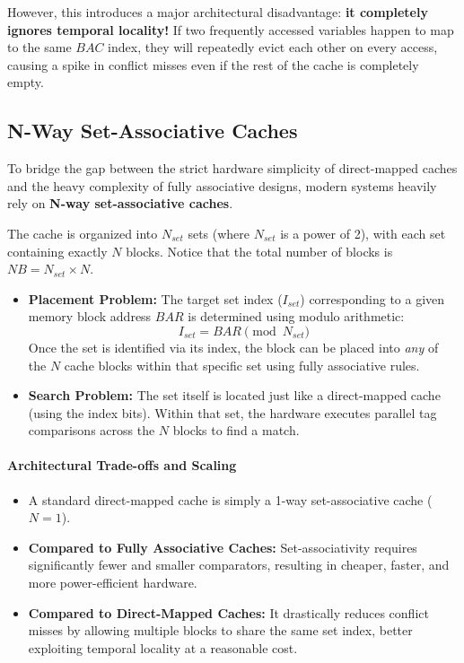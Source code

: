 However, this introduces a major architectural disadvantage: \textbf{it completely ignores temporal locality!} If two frequently accessed variables happen to map to the same $BAC$ index, they will repeatedly evict each other on every access, causing a spike in conflict misses even if the rest of the cache is completely empty.

\subsection{N-Way Set-Associative Caches}
To bridge the gap between the strict hardware simplicity of direct-mapped caches and the heavy complexity of fully associative designs, modern systems heavily rely on \textbf{N-way set-associative caches}. 

The cache is organized into $N_{set}$ sets (where $N_{set}$ is a power of 2), with each set containing exactly $N$ blocks. Notice that the total number of blocks is $NB = N_{set} \times N$.
\begin{itemize}
    \item \textbf{Placement Problem:} The target set index ($I_{set}$) corresponding to a given memory block address $BAR$ is determined using modulo arithmetic:
    \[ I_{set} = BAR \pmod{N_{set}} \]
    Once the set is identified via its index, the block can be placed into \emph{any} of the $N$ cache blocks within that specific set using fully associative rules.
    \item \textbf{Search Problem:} The set itself is located just like a direct-mapped cache (using the index bits). Within that set, the hardware executes parallel tag comparisons across the $N$ blocks to find a match.
\end{itemize}

\paragraph{Architectural Trade-offs and Scaling}
\begin{itemize}
    \item A standard direct-mapped cache is simply a 1-way set-associative cache ($N = 1$).
    \item \textbf{Compared to Fully Associative Caches:} Set-associativity requires significantly fewer and smaller comparators, resulting in cheaper, faster, and more power-efficient hardware.
    \item \textbf{Compared to Direct-Mapped Caches:} It drastically reduces conflict misses by allowing multiple blocks to share the same set index, better exploiting temporal locality at a reasonable cost.
\end{itemize}

